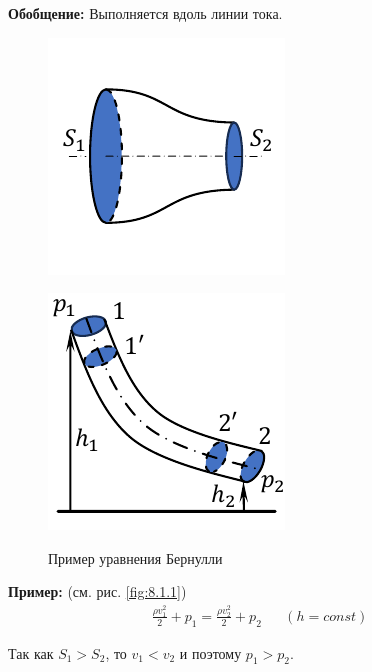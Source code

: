 \textbf{Обобщение:} Выполняется вдоль линии тока.
\begin{figure}[h]
	\centering
	\begin{minipage}{0.49\linewidth}
		\centering
		\includegraphics[width=0.7\linewidth]{image/Уравнение Бернули 2.pdf}
		\subcaption{ }
		\label{fig:8.1.1}
	\end{minipage}
	\hfill
	\begin{minipage}{0.49\linewidth}
		\centering
		\includegraphics[width=0.7\linewidth]{image/Уравнение Бернули.pdf}
		\subcaption{ }
		\label{fig:8.1.2}
	\end{minipage}
	\caption{Пример уравнения Бернулли}
	\label{fig:bernoulli}
\end{figure}

\textbf{Пример:} (см. рис. \ref{fig:8.1.1})
\[\begin{aligned}
	\frac{\rho v_1^2}{2} + p_1 = \frac{\rho v_2^2}{2} + p_2 && (h = const)
\end{aligned}\]

Так как $S_1 > S_2$, то $v_1 < v_2$ и поэтому $p_1 > p_2$.